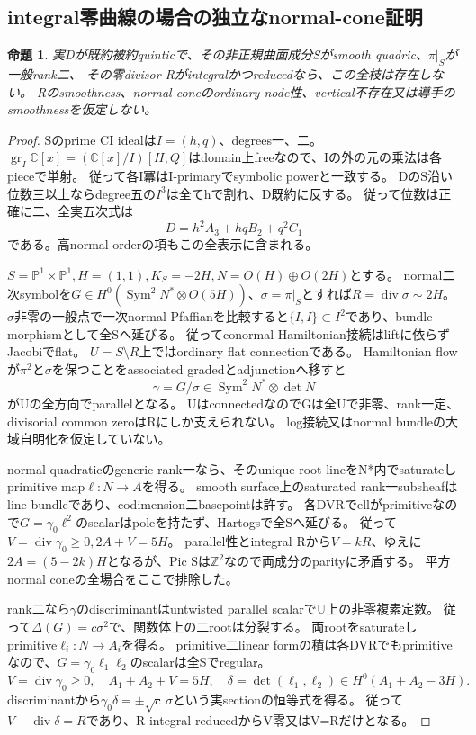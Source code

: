 \documentclass[a4paper,11pt]{ltjsarticle}
\newtheorem{proposition}{命題}[section]
\theoremstyle{definition}
\begin{document}
\subsection{integral零曲線の場合の独立なnormal-cone証明}
\begin{proposition}\label{prop:smooth-quadric-ranktwo-integral-zero-empty}
実Dが既約被約quinticで、その非正規曲面成分Sがsmooth quadric、$\pi|_S$が一般rank二、
その零divisor Rがintegralかつreducedなら、この全枝は存在しない。
Rのsmoothness、normal-coneのordinary-node性、vertical不存在又は導手のsmoothnessを仮定しない。
\end{proposition}
\begin{proof}
Sのprime CI idealは$I=(h,q)$、degrees一、二。
$\operatorname{gr}_I\mathbb C[x]=(\mathbb C[x]/I)[H,Q]$はdomain上freeなので、Iの外の元の乗法は各pieceで単射。
従って各I冪はI-primaryでsymbolic powerと一致する。
DのS沿い位数三以上ならdegree五の$I^3$は全てhで割れ、D既約に反する。
従って位数は正確に二、全実五次式は
\[
 D=h^2A_3+hqB_2+q^2C_1
\]
である。高normal-orderの項もこの全表示に含まれる。

$S=\mathbb P^1\times\mathbb P^1,H=(1,1),K_S=-2H,N=O(H)\oplus O(2H)$とする。
normal二次symbolを$G\in H^0(\operatorname{Sym}^2N^*\otimes O(5H))$、$\sigma=\pi|_S$とすれば$R=\operatorname{div}\sigma\sim2H$。
$\sigma$非零の一般点で一次normal Pfaffianを比較すると$\{I,I\}\subset I^2$であり、bundle morphismとして全Sへ延びる。
従ってconormal Hamiltonian接続はliftに依らずJacobiでflat。
$U=S\setminus R$上ではordinary flat connectionである。
Hamiltonian flowが$\pi^2$と$\sigma$を保つことをassociated gradedとadjunctionへ移すと
\[
 \gamma=G/\sigma\in\operatorname{Sym}^2N^*\otimes\det N
\]
がUの全方向でparallelとなる。
UはconnectedなのでGは全Uで非零、rank一定、divisorial common zeroはRにしか支えられない。
log接続又はnormal bundleの大域自明化を仮定していない。

normal quadraticのgeneric rank一なら、そのunique root lineをN*内でsaturateしprimitive map$\ell:N\to A$を得る。
smooth surface上のsaturated rank一subsheafはline bundleであり、codimension二basepointは許す。
各DVRでellがprimitiveなので$G=\gamma_0\ell^2$のscalarはpoleを持たず、Hartogsで全Sへ延びる。
従って$V=\operatorname{div}\gamma_0\ge0,2A+V=5H$。
parallel性とintegral Rから$V=kR$、ゆえに$2A=(5-2k)H$となるが、Pic Sは$\mathbb Z^2$なので両成分のparityに矛盾する。
平方normal coneの全場合をここで排除した。

rank二なら$\gamma$のdiscriminantはuntwisted parallel scalarでU上の非零複素定数。
従って$\Delta(G)=c\sigma^2$で、関数体上の二rootは分裂する。
両rootをsaturateしprimitive$\ell_i:N\to A_i$を得る。
primitive二linear formの積は各DVRでもprimitiveなので、$G=\gamma_0\ell_1\ell_2$のscalarは全Sでregular。
\[
 V=\operatorname{div}\gamma_0\ge0,\quad A_1+A_2+V=5H,\quad
 \delta=\det(\ell_1,\ell_2)\in H^0(A_1+A_2-3H).
\]
discriminantから$\gamma_0\delta=\pm\sqrt c\,\sigma$という実sectionの恒等式を得る。
従って$V+\operatorname{div}\delta=R$であり、R integral reducedからV零又はV=Rだけとなる。


\end{proof}
\end{document}
